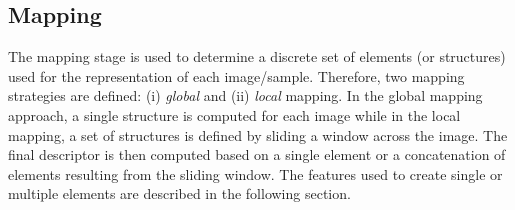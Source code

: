 \subsection{Mapping}\label{chp3-subsec2}
The mapping stage is used to determine a discrete set of elements (or structures) used for the representation of each image/sample.
Therefore, two mapping strategies are defined: (i) \emph{global} and (ii) \emph{local} mapping.
In the global mapping approach, a single structure is computed for each image while in the local mapping, a set of structures is defined by sliding a window across the image.
The final descriptor is then computed based on a single element or a concatenation of elements resulting from the sliding window.
The features used to create single or multiple elements are described in the following section.


